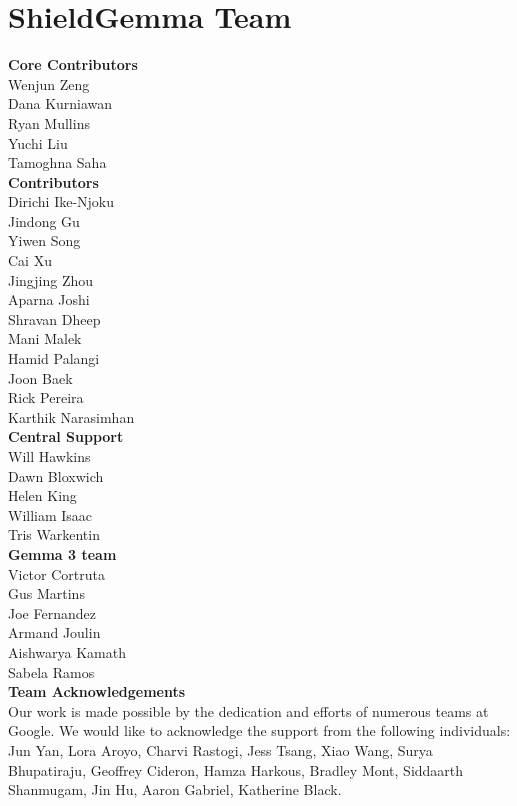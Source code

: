 \clearpage

\section{ShieldGemma Team}
\label{sec:contributions}


\noindent\textbf{Core Contributors} \\
Wenjun Zeng \\
Dana Kurniawan \\
Ryan Mullins \\
Yuchi Liu \\
Tamoghna Saha \\  


\noindent\textbf{Contributors} \\
Dirichi Ike-Njoku \\
Jindong Gu \\
Yiwen Song \\
Cai Xu \\
Jingjing Zhou \\
Aparna Joshi \\
Shravan Dheep \\
Mani Malek \\
Hamid Palangi \\
Joon Baek \\
Rick Pereira \\
Karthik Narasimhan \\

\noindent\textbf{Central Support}\\
Will Hawkins \\
Dawn Bloxwich \\
Helen King \\
William Isaac \\
Tris Warkentin \\

\noindent\textbf{Gemma 3 team\ \ }\\
Victor Cortruta \\
Gus Martins \\ 
Joe Fernandez \\
Armand Joulin \\
Aishwarya Kamath \\ 
Sabela Ramos \\ 


\noindent\textbf{Team Acknowledgements} \\
Our work is made possible by the dedication and efforts of numerous teams at Google. We would like to acknowledge the support from the following individuals: Jun Yan, Lora Aroyo, Charvi Rastogi, Jess Tsang, Xiao Wang, Surya Bhupatiraju, Geoffrey Cideron, Hamza Harkous, Bradley Mont, Siddaarth Shanmugam, Jin Hu, Aaron Gabriel, Katherine Black.

